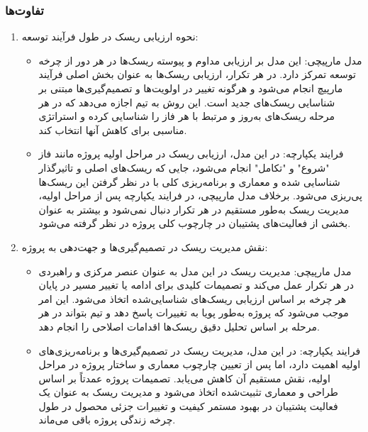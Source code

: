 \subsubsection*{تفاوت‌ها}
\begin{enumerate}
    \item نحوه ارزیابی ریسک در طول فرآیند توسعه:
    \begin{itemize}
        \item مدل مارپیچی: این مدل بر ارزیابی مداوم و پیوسته ریسک‌ها در هر دور از چرخه توسعه تمرکز دارد. در هر تکرار، ارزیابی ریسک‌ها به عنوان بخش اصلی فرآیند مارپیچ انجام می‌شود و هرگونه تغییر در اولویت‌ها و تصمیم‌گیری‌ها مبتنی بر شناسایی ریسک‌های جدید است. این روش به تیم اجازه می‌دهد که در هر مرحله ریسک‌های به‌روز و مرتبط با هر فاز را شناسایی کرده و استراتژی مناسبی برای کاهش آنها انتخاب کند.
        \item فرایند یکپارچه: در این مدل، ارزیابی ریسک در مراحل اولیه پروژه مانند فاز "شروع" و "تکامل" انجام می‌شود، جایی که ریسک‌های اصلی و تاثیرگذار شناسایی شده و معماری و برنامه‌ریزی کلی با در نظر گرفتن این ریسک‌ها پی‌ریزی می‌شود. برخلاف مدل مارپیچی، در فرایند یکپارچه پس از مراحل اولیه، مدیریت ریسک به‌طور مستقیم در هر تکرار دنبال نمی‌شود و بیشتر به عنوان بخشی از فعالیت‌های پشتیبان در چارچوب کلی پروژه در نظر گرفته می‌شود.
    \end{itemize}
    \item نقش مدیریت ریسک در تصمیم‌گیری‌ها و جهت‌دهی به پروژه:
    \begin{itemize}
        \item مدل مارپیچی: مدیریت ریسک در این مدل به عنوان عنصر مرکزی و راهبردی در هر تکرار عمل می‌کند و تصمیمات کلیدی برای ادامه یا تغییر مسیر در پایان هر چرخه بر اساس ارزیابی ریسک‌های شناسایی‌شده اتخاذ می‌شود. این امر موجب می‌شود که پروژه به‌طور پویا به تغییرات پاسخ دهد و تیم بتواند در هر مرحله بر اساس تحلیل دقیق ریسک‌ها اقدامات اصلاحی را انجام دهد.
        \item فرایند یکپارچه: در این مدل، مدیریت ریسک در تصمیم‌گیری‌ها و برنامه‌ریزی‌های اولیه اهمیت دارد، اما پس از تعیین چارچوب معماری و ساختار پروژه در مراحل اولیه، نقش مستقیم آن کاهش می‌یابد. تصمیمات پروژه عمدتاً بر اساس طراحی و معماری تثبیت‌شده اتخاذ می‌شود و مدیریت ریسک به عنوان یک فعالیت پشتیبان در بهبود مستمر کیفیت و تغییرات جزئی محصول در طول چرخه زندگی پروژه باقی می‌ماند.
    \end{itemize}
\end{enumerate}

